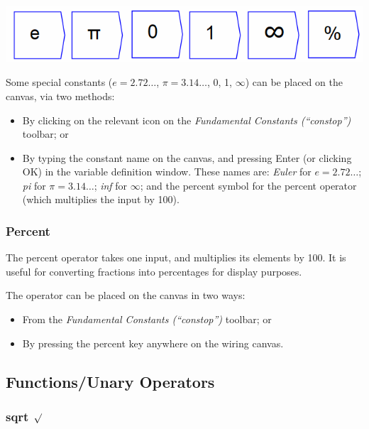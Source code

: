 \label{Special-constants}

\includegraphics{images/FundamentalConstants}

\label{Operation:euler}\label{Operation:pi}\label{Operation:zero}\label{Operation:one}
\label{Operation:inf}

Some special constants ($e=2.72\ldots$, $\pi=3.14\ldots$, 0, 1,
$\infty$) can be placed on the canvas, via two methods:
\begin{itemize}
\item By clicking on the relevant icon on the \emph{Fundamental Constants
(``constop'')} toolbar; or 
\item By typing the constant name on the canvas, and pressing Enter (or
clicking OK) in the variable definition window. These names are: \textit{Euler}
for $e=2.72\ldots$; \textit{pi} for $\pi=3.14\ldots$; \textit{inf}
for $\infty$; and the percent symbol for the percent operator (which
multiplies the input by 100).
\end{itemize}

\subsubsection{Percent}


\label{Operation:percent} The percent operator takes one input, and
multiplies its elements by 100. It is useful for converting fractions
into percentages for display purposes.

The operator can be placed on the canvas in two ways:
\begin{itemize}
\item From the \emph{Fundamental Constants (``constop'')} toolbar; or 
\item By pressing the percent key anywhere on the wiring canvas. 
\end{itemize}

\subsection{Functions/Unary Operators}

\label{Functions/Unary-Operators}

\subsubsection{sqrt $\protect\surd$}

